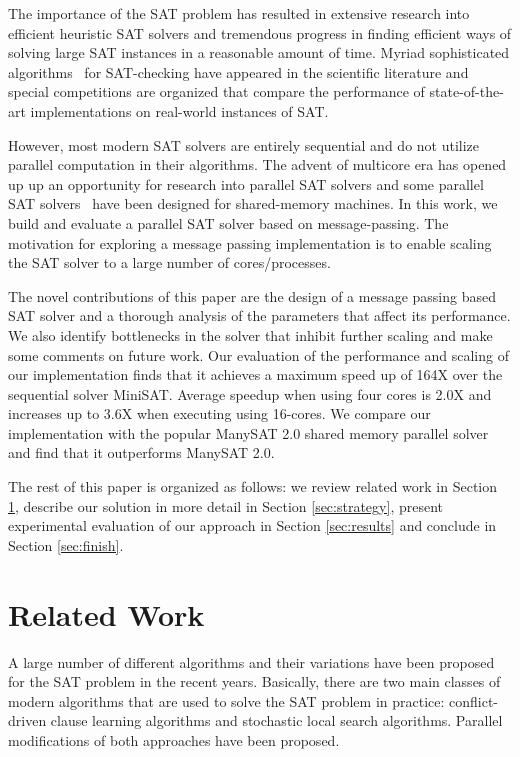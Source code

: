 \documentclass[letterpaper, compsoc, conference]{IEEEtran}
\begin{document}
The importance of the SAT problem has resulted in extensive research into
efficient heuristic SAT solvers and tremendous progress in finding efficient
ways of solving large SAT instances in a reasonable amount of time.  Myriad
sophisticated algorithms~\cite{Davis1962, Selman1992, Zhang94sato,
Selman95localsearch, PSATO, Bohm96, Silva1997GRASP, Moskewicz2001Chaff,
Forman02NagSat, MiniSat, Blochinger2003, Chrabakh03gradsat, Jurkowiak2005,
Lewis2007MiraXT, PMiniSat, Gil08Pmsat, ManySAT} for SAT-checking have appeared
in the scientific literature and special competitions \cite{SATRace2008} are
organized that compare the performance of state-of-the-art implementations on
real-world instances of SAT. 

However, most modern SAT solvers are entirely sequential and do not utilize
parallel computation in their algorithms. The advent of multicore era has
opened up up an opportunity for research into parallel SAT solvers and some
parallel SAT solvers~\cite{ManySAT} have been designed for shared-memory
machines.  In this work, we build and evaluate a parallel SAT solver based on
message-passing. The motivation for exploring a message passing implementation
is to enable scaling the SAT solver to a large number of cores/processes.

The novel contributions of this paper are the design of a message passing based
SAT solver and a thorough analysis of the parameters that affect its
performance. We also identify bottlenecks in the solver that inhibit further
scaling and make some comments on future work.  Our evaluation of the
performance and scaling of our implementation finds that it achieves a
maximum speed up of 164X over the sequential solver MiniSAT. Average speedup
when using four cores is 2.0X and increases up to 3.6X when executing using
16-cores. We compare our implementation with the popular ManySAT 2.0 shared
memory parallel solver and find that it outperforms ManySAT 2.0. 

The rest of this paper is organized as follows: we review related work in
Section \ref{sec:related}, describe our solution in more detail in Section
\ref{sec:strategy}, present experimental evaluation of our approach in Section
\ref{sec:results} and conclude in Section \ref{sec:finish}.

\section{Related Work}
\label{sec:related}

A large number of different algorithms and their variations have been proposed for 
the SAT problem in the recent years. Basically, there are two main classes of modern 
algorithms that are used to solve the SAT problem in practice: conflict-driven 
clause learning algorithms and stochastic local search algorithms. Parallel modifications 
of both approaches have been proposed.
\end{document}
